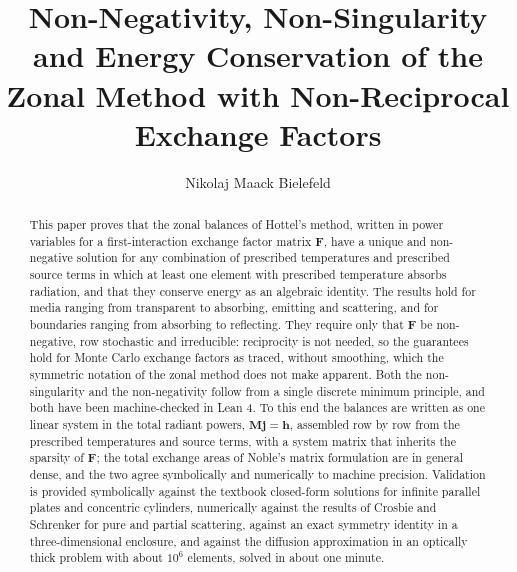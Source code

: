 \documentclass[preprint,1p,times]{elsarticle}
\theoremstyle{plain}
\theoremstyle{definition}
\theoremstyle{remark}
\begin{document}
\begin{frontmatter}

\title{Non-Negativity, Non-Singularity and Energy Conservation of the Zonal Method with Non-Reciprocal Exchange Factors}

\author{Nikolaj Maack Bielefeld}


\begin{abstract}
This paper proves that the zonal balances of Hottel's method, written in power variables for a first-interaction exchange factor matrix $\mathbf{F}$, have a unique and non-negative solution for any combination of prescribed temperatures and prescribed source terms in which at least one element with prescribed temperature absorbs radiation, and that they conserve energy as an algebraic identity. The results hold for media ranging from transparent to absorbing, emitting and scattering, and for boundaries ranging from absorbing to reflecting. They require only that $\mathbf{F}$ be non-negative, row stochastic and irreducible: reciprocity is not needed, so the guarantees hold for Monte Carlo exchange factors as traced, without smoothing, which the symmetric notation of the zonal method does not make apparent. Both the non-singularity and the non-negativity follow from a single discrete minimum principle, and both have been machine-checked in Lean 4. To this end the balances are written as one linear system in the total radiant powers, $\mathbf{M}\mathbf{j} = \mathbf{h}$, assembled row by row from the prescribed temperatures and source terms, with a system matrix that inherits the sparsity of $\mathbf{F}$; the total exchange areas of Noble's matrix formulation are in general dense, and the two agree symbolically and numerically to machine precision. Validation is provided symbolically against the textbook closed-form solutions for infinite parallel plates and concentric cylinders, numerically against the results of Crosbie and Schrenker for pure and partial scattering, against an exact symmetry identity in a three-dimensional enclosure, and against the diffusion approximation in an optically thick problem with about $10^6$ elements, solved in about one minute.
\end{abstract}


\end{frontmatter}
\end{document}

